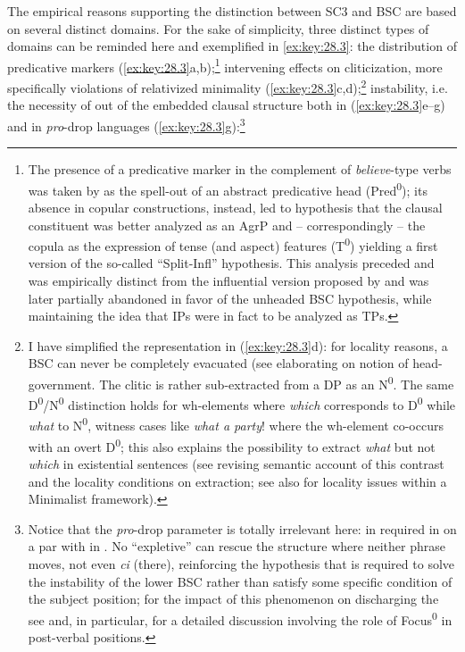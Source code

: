 \documentclass[output=paper]{langsci/langscibook}
\begin{document}
The empirical reasons supporting the distinction between \gls{SC3} and
\gls{BSC} are based on several distinct domains. For the sake of simplicity,
three distinct types of domains can be reminded here and exemplified in
\eqref{ex:key:28.3}: the distribution of predicative markers
(\ref{ex:key:28.3}a,b);\footnote{The presence of a predicative
    marker in the complement of \emph{believe}-type verbs was taken by
    \citet{Moro1988} as the spell-out of an abstract
    predicative head (Pred\textsuperscript{0}); its absence in
    copular constructions, instead, led to hypothesis that the
    clausal constituent was better analyzed as an AgrP and -- correspondingly --
    the copula as the expression of tense (and aspect) features
    (T\textsuperscript{0}) yielding a first version of the so-called
    “Split-Infl” hypothesis. This analysis preceded and was empirically
    distinct from the influential version proposed by \citet{Pollock1989} and
was later partially abandoned in favor of the unheaded \gls{BSC} hypothesis,
while maintaining the idea that IPs were in fact to be analyzed as TPs.}
intervening effects on cliticization, more specifically violations of
 relativized minimality (\ref{ex:key:28.3}c,d);\footnote{I
    have simplified the representation in (\ref{ex:key:28.3}d): for locality
    reasons, a \gls{BSC} can never be completely evacuated (see
    \citet{Moro1993} elaborating on  notion of
    head-government. The clitic is rather sub-extracted from a DP as an
    N\textsuperscript{0}. The same D\textsuperscript{0}/N\textsuperscript{0}
    distinction holds for wh-elements where \emph{which} corresponds to
    D\textsuperscript{0} while \emph{what} to N\textsuperscript{0}, witness
    cases like \emph{what a party}! where the wh-element co-occurs with an
    overt D\textsuperscript{0}; this also explains the possibility to extract
    \emph{what} but not \emph{which} in existential sentences (see
    \citealt{Moro1997} revising  semantic account of this contrast
    and the locality conditions on extraction; see also \citealt{Moro1993} for
locality issues within a Minimalist framework).} instability, i.e. the
necessity of  out of the embedded clausal structure both in 
(\ref{ex:key:28.3}e--g) and in \emph{pro}-drop languages
(\ref{ex:key:28.3}g):\footnote{Notice that the \emph{pro}-drop parameter is
    totally irrelevant here:  in required in  on a par with in
    . No “expletive” can rescue the structure where neither phrase
    moves, not even \emph{ci} (there), reinforcing the hypothesis that 
    is required to solve the instability of the lower \gls{BSC} rather than
    satisfy some specific condition of the subject position; for the impact of
    this phenomenon on discharging the  see
    \citet{Moro1997,Moro2000} and, in particular, \citet{Moro2009} for a
    detailed discussion involving the role of Focus\textsuperscript{0} in
post-verbal positions.}
\end{document}
